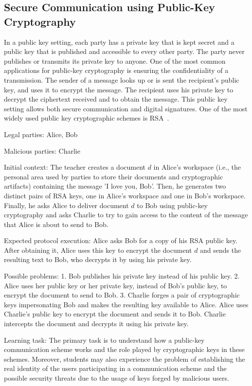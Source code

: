 \documentclass[conference]{IEEEtran}
\begin{document}
\subsection{ Secure Communication using Public-Key Cryptography}

In a public key setting, each party has a private key that is kept
secret and a public key that is published and accessible to every
other party. The party never publishes or transmits its private key to
anyone. One of the most common applications for public-key
cryptography is ensuring the confidentiality of a transmission. The
sender of a message looks up or is sent the recipient's public key,
and uses it to encrypt the message. The recipient uses his private
key to decrypt the ciphertext received and to obtain the message. 
This public key setting allows both secure communication and
digital signatures. One of the most widely used public key cryptographic schemes is RSA~\cite{rivest77}.

{\sc Legal parties:} Alice, Bob

{\sc Malicious parties:} Charlie

{\sc Initial context:} The teacher creates a document $d$ in Alice's
workspace (i.e., the personal area used by parties to store their
documents and cryptographic artifacts) containing the message 'I love you, Bob'. Then, he generates
two distinct pairs of RSA keys, one in Alice's workspace and one in
Bob's workspace. Finally, he asks Alice to deliver document $d$
to Bob using public-key cryptography and asks Charlie to try to
gain access to the content of the message that Alice is about to send to Bob.  

{\sc Expected protocol execution:} Alice asks Bob for a copy
of his RSA public key. After obtaining it, Alice uses this key
to encrypt the document $d$ and sends the resulting text to Bob, who decrypts it by using his private key.

{\sc Possible problems:} 1. Bob publishes his private key instead of
his public key. 2. Alice uses her public key or her private key,
instead of Bob's public key, to encrypt the document to send to Bob.
3. Charlie forges a pair of cryptographic keys impersonating Bob and
makes the resulting key available to Alice. Alice uses Charlie's
public key to encrypt the document and sends it to Bob. Charlie
intercepts the document and decrypts it using his private key.

{\sc Learning task:} The primary task is to understand how
a public-key communication scheme works and the role played by
cryptographic keys in these schemes. Moreover, students may also
experience the problem of establishing the real identity
of the users participating in a communication scheme and the possible
security threats due to the usage of keys forged by malicious users. 
\end{document}
